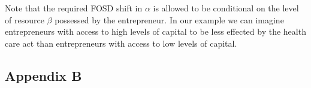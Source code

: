 \documentclass[12pt]{article}
\begin{document}
Note that the required FOSD shift in $\alpha$ is allowed to be conditional on the level of resource $\beta$ possessed by the entrepreneur. In our example we can imagine entrepreneurs with access to high levels of capital to be less effected by the health care act than entrepreneurs with access to low levels of capital.  

\begin{comment}

Next, consider how an increase in the distribution of $F_{Y_\alpha}$ impacts ideas from previous periods if those ideas are retained by the entrepreneur. Each period $T$'s expected number of startups becomes
\begin{align}
\mathbb{E}^T_Y[F_{X}] = \mathbb{E}_{Y_T}[F_{X}] + \sum_{t=0}^{T-1} max(0,\mathbb{E}_{Y_T}[F_{X}] - max(\mathbb{E}_{Y_i}[F_{X}] \forall i \in T{-}1,\dots,t)))
\label{eq:prop4}
\end{align}
This implies the expected number of startups should decrease after the initial shift in $F_{Y_\alpha}$ when the distribution of other constraints $F_{Y_{-\alpha}}$ is held constant over time. 

\textbf{Proposition 4:} If in any three consecutive periods $t=0,1,2$
\begin{enumerate}[(a)]
\item $F_{Y_\alpha,t=1} \mathop{\ge}_{\text{FOSD}} F_{Y_\alpha,t=0} $
\item $F_{Y_\alpha,t=1} = F_{Y_\alpha,t=2} $
\item $F_{Y_{-\alpha}|\alpha,t=0} = F_{Y_{-\alpha}|\alpha,t=1} =F_{Y_{-\alpha}|\alpha,t=2}$
\end{enumerate}
then
\begin{enumerate}[(a)]
\setcounter{enumi}{3}
\item $\mathbb{E}_{Y}[F_{Y_\alpha,t=1}] \ge \mathbb{E}_{Y}[F_{Y_\alpha,t=2}]$
\item $\mathbb{E}_{Y}[F_{Y_\alpha,t=2}] \ge \mathbb{E}_{Y}[F_{Y_\alpha,t=0}]$
\end{enumerate}

\textbf{Proof:} (d) follows from (\ref{eq:prop4}) and the expectation properties of first order stochastic dominance. (e) follows also from the properties of first order stochastic dominance.

\end{comment}

\subsection*{Appendix B}
\end{document}
